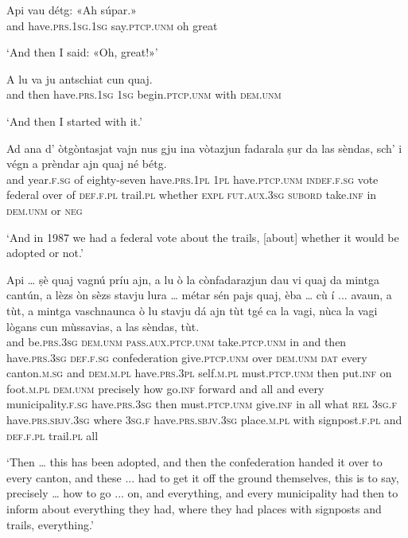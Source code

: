 \begin{linenumbers}
\gll Api vau détg: «Ah súpar.»\\
and have.\textsc{prs.1sg.1sg} say.\textsc{ptcp.unm} oh great\\
\end{linenumbers}
\medskip
\glt `And then I said: «Oh, great!»'
\medskip

\largerpage
\begin{linenumbers}
\gll  A lu va ju antschiat cun quaj.  \\
and then have.\textsc{prs.1sg} \textsc{1sg} begin.\textsc{ptcp.unm} with \textsc{dem.unm}\\
\end{linenumbers}
\medskip
\glt `And then I started with it.'
\clearpage

\begin{linenumbers}
\gll Ad ana d' òtgòntasjat vajn nus gju ina vòtazjun fadarala ṣur da las sèndas, sch' i végn a prèndar ajn quaj né bétg.   \\
and year.\textsc{f.sg} of eighty-seven have.\textsc{prs.1pl} \textsc{1pl} have.\textsc{ptcp.unm} \textsc{indef.f.sg} vote federal over of \textsc{def.f.pl} trail.\textsc{pl} whether \textsc{expl} \textsc{fut.aux.3sg} \textsc{subord} take.\textsc{inf} in \textsc{dem.unm} or \textsc{neg}  \\
\end{linenumbers}
\medskip
\glt `And in 1987 we had a federal vote about the trails, [about] whether it would be adopted or not.'
\medskip

\begin{linenumbers}
\gll Api … ṣè quaj vagnú príu ajn, a lu ò la cònfadarazjun dau vi quaj da mintga cantún, a lèzs òn sèzs stavju lura … métar sén pajs quaj, èba … cù í ... avaun, a tùt, a mintga vaschnaunca ò lu stavju dá ajn tùt tgé ca la vagi, nùca la vagi lògans cun mùssavias, a las sèndas, tùt.   \\
and {} be.\textsc{prs.3sg} \textsc{dem.unm} \textsc{pass.aux.ptcp.unm} take.\textsc{ptcp.unm} in and then have.\textsc{prs.3sg} \textsc{def.f.sg} confederation give.\textsc{ptcp.unm} over \textsc{dem.unm} \textsc{dat} every canton.\textsc{m.sg} and \textsc{dem.m.pl} have.\textsc{prs.3pl} self.\textsc{m.pl} must.\textsc{ptcp.unm} then {} put.\textsc{inf} on foot.\textsc{m.pl} \textsc{dem.unm} precisely {} how go.\textsc{inf} {} forward and all and every municipality.\textsc{f.sg} have.\textsc{prs.3sg} then must.\textsc{ptcp.unm} give.\textsc{inf} in all what \textsc{rel} \textsc{3sg.f} have.\textsc{prs.sbjv.3sg} where \textsc{3sg.f} have.\textsc{prs.sbjv.3sg} place.\textsc{m.pl} with signpost.\textsc{f.pl} and \textsc{def.f.pl} trail.\textsc{pl} all \\
\end{linenumbers}
\medskip
\glt `Then … this has been adopted, and then the confederation handed it over to every canton, and these ... had to get it off the ground themselves, this is to say, precisely … how to go ... on, and everything, and every municipality had then to inform about everything they had, where they had places with signposts and trails, everything.'
\medskip

